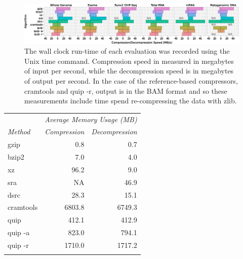\documentclass[a4,center,fleqn]{NAR}
\begin{document}
\begin{figure}
\centerline{\includegraphics[width=\textwidth]{comp_decomp_time.eps}}
\caption{
The wall clock run-time of each evaluation was recorded using the Unix time
command. Compression speed in measured in megabytes of input per second, while
the decompression speed is in megabytes of output per second. In the case of
the reference-based compressors, cramtools and quip -r, output is in the BAM
format and so these measurements include time spend re-compressing the data
with zlib.
}
\label{fig:comp_decomp_time}
\end{figure}




\begin{table}
{
\begin{tabular}{@{}lrr@{}}
\toprule
                & \multicolumn{2}{c}{\textit{Average Memory Usage (MB)}} \\ \cline{2-3}
\textit{Method} & \textit{Compression} & \textit{Decompression} \\ \colrule
gzip            &     0.8              &    0.7 \\
bzip2           &     7.0              &    4.0 \\
xz              &    96.2              &    9.0 \\
sra             &      NA              &   46.9 \\
dsrc            &    28.3              &   15.1 \\
cramtools       &  6803.8              & 6749.3 \\
quip            &   412.1              &  412.9 \\
quip -a         &   823.0              &  794.1 \\
quip -r         &  1710.0              & 1717.2 \\ \botrule
\end{tabular}
}
{}
\end{table}
\end{document}
